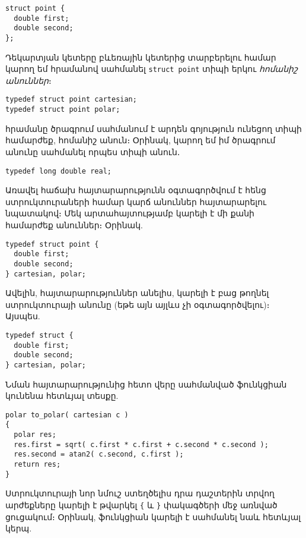 \begin{Verbatim}
struct point {
  double first;
  double second;
};
\end{Verbatim}

Դեկարտյան կետերը բևեռային կետերից տարբերելու համար կարող եմ 
հրամանով սահմանել \texttt{struct point} տիպի երկու \emph{հոմանիշ անուններ}։

\begin{Verbatim}
typedef struct point cartesian;
typedef struct point polar;
\end{Verbatim}

 հրամանը ծրագրում սահմանում է արդեն գոյություն ունեցող տիպի
համարժեք, հոմանիշ անուն։ Օրինակ, կարող եմ իմ ծրագրում  անունը
սահմանել որպես   տիպի անուն․

\begin{Verbatim}
typedef long double real;
\end{Verbatim}

Առավել հաճախ  հայտարարությունն օգտագործվում է հենց ստրուկտուրաների
համար կարճ անուններ հայտարարելու նպատակով։ Մեկ  արտահայտությամբ
կարելի է մի քանի համարժեք անուններ։ Օրինակ.

\begin{Verbatim}
typedef struct point {
  double first;
  double second;
} cartesian, polar;
\end{Verbatim}

Ավելին,  հայտարարություններ անելիս, կարելի է բաց թողնել
ստրուկտուրայի անունը (եթե այն այլևս չի օգտագործվելու)։ Այսպես.

\begin{Verbatim}
typedef struct {
  double first;
  double second;
} cartesian, polar;
\end{Verbatim}

Նման հայտարարությունից հետո վերը սահմանված  ֆունկցիան
կունենա հետևյալ տեսքը.

\begin{Verbatim}
polar to_polar( cartesian c )
{
  polar res;
  res.first = sqrt( c.first * c.first + c.second * c.second );
  res.second = atan2( c.second, c.first );
  return res;
}
\end{Verbatim}

Ստրուկտուրայի նոր նմուշ ստեղծելիս դրա դաշտերին տրվող արժեքները կարելի
է թվարկել \Verb|{| և \Verb|}| փակագծերի մեջ առնված ցուցակում։ Օրինակ,
 ֆունկցիան կարելի է սահմանել նաև հետևյալ կերպ.

